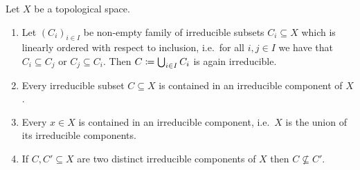 \begin{proposition}
  \label{proposition: irreducible components for alls topological spaces}
  Let $X$ be a topological space.
  \begin{enumerate}
    \item
      Let $(C_i)_{i \in I}$ be non-empty family of irreducible subsets $C_i \subseteq X$ which is linearly ordered with respect to inclusion, i.e.\ for all $i, j \in I$ we have that $C_i \subseteq C_j$ or $C_j \subseteq C_i$.
      Then $C \coloneqq \bigcup_{i \in I} C_i$ is again irreducible.
    \item
      Every irreducible subset $C \subseteq X$ is contained in an irreducible component of $X$.
    \item
      Every $x \in X$ is contained in an irreducible component, i.e.\ $X$ is the union of its irreducible components.
    \item
      If $C, C' \subseteq X$ are two distinct irreducible components of $X$ then $C \nsubseteq C'$.
  \end{enumerate}
\end{proposition}


